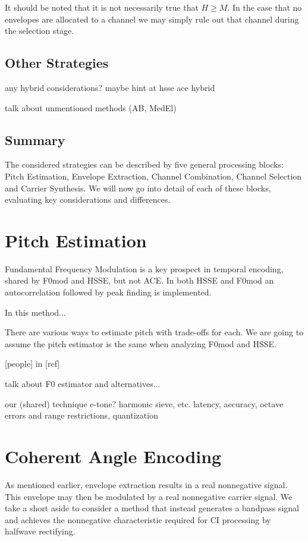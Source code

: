 \documentclass [11pt, proquest] {uwthesis}[2015/03/03]
\begin{document}
It should be noted that it is not necessarily true that $H \geq M$.  In the case that no envelopes are allocated to a channel we may simply rule out that channel during the selection stage.

\subsection{Other Strategies}

any hybrid considerations?  maybe hint at hsse ace hybrid

talk about unmentioned methods (AB, MedEl)

\subsection{Summary}

The considered strategies can be described by five general processing blocks: Pitch Estimation, Envelope Extraction, Channel Combination, Channel Selection and Carrier Synthesis.  We will now go into detail of each of these blocks, evaluating key considerations and differences.

\section{Pitch Estimation}

Fundamental Frequency Modulation is a key prospect in temporal encoding, shared by F0mod and HSSE, but not ACE.  In both HSSE and F0mod an autocorrelation followed by peak finding is implemented.

In this method...

There are various ways to estimate pitch with trade-offs for each.  We are going to assume the pitch estimator is the same when analyzing F0mod and HSSE.


 [people] in [ref] 

talk about F0 estimator and alternatives...

    our (shared) technique
    e-tone? harmonic sieve, etc.
    latency, accuracy, octave errors and range restrictions,
    quantization

\section{Coherent Angle Encoding}

As mentioned earlier, envelope extraction results in a real nonnegative signal.  This envelope may then be modulated by a real nonnegative carrier signal.  We take a short aside to consider a method that instead generates a bandpass signal and achieves the nonnegative characteristic required for CI processing by halfwave rectifying.
\end{document}
